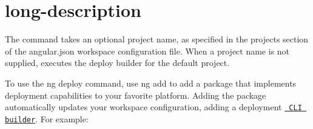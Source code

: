 \chapter{long-\/description}
\hypertarget{md__d_1_2_g_i_t_2_food_link_2foodlink_8client_2node__modules_2_0dangular_2cli_2src_2commands_2deploy_2long-description}{}\label{md__d_1_2_g_i_t_2_food_link_2foodlink_8client_2node__modules_2_0dangular_2cli_2src_2commands_2deploy_2long-description}
The command takes an optional project name, as specified in the {\ttfamily projects} section of the {\ttfamily angular.\+json} workspace configuration file. When a project name is not supplied, executes the {\ttfamily deploy} builder for the default project.

To use the {\ttfamily ng deploy} command, use {\ttfamily ng add} to add a package that implements deployment capabilities to your favorite platform. Adding the package automatically updates your workspace configuration, adding a deployment \href{guide/cli-builder}{\texttt{ CLI builder}}. For example\+:


\begin{DoxyCode}{0}
\DoxyCodeLine{\ \ \ \ \ \ \}}
\DoxyCodeLine{\ \ \ \ \}}
\DoxyCodeLine{\ \ \}}
\DoxyCodeLine{\}}

\end{DoxyCode}
 